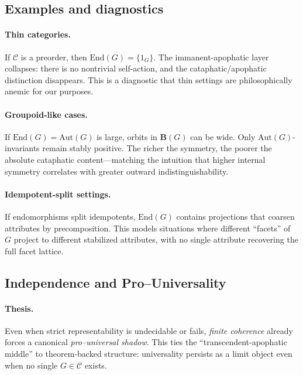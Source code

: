 \documentclass[11pt]{article}
\theoremstyle{upright}
\begin{document}
\subsection{Examples and diagnostics}
\paragraph{Thin categories.} If \(\mathcal C\) is a preorder, then \(\mathrm{End}(G)=\{1_G\}\). The immanent-apophatic layer collapses: there is no nontrivial self-action, and the cataphatic/apophatic distinction disappears. This is a diagnostic that thin settings are philosophically anemic for our purposes.

\paragraph{Groupoid-like cases.} If \(\mathrm{End}(G)=\mathrm{Aut}(G)\) is large, orbits in \(\mathbf B(G)\) can be wide. Only \(\mathrm{Aut}(G)\)-invariants remain stably positive. The richer the symmetry, the poorer the absolute cataphatic content—matching the intuition that higher internal symmetry correlates with greater outward indistinguishability.

\paragraph{Idempotent-split settings.} If endomorphisms split idempotents, \(\mathrm{End}(G)\) contains projections that coarsen attributes by precomposition. This models situations where different “facets” of \(G\) project to different stabilized attributes, with no single attribute recovering the full facet lattice.

\subsection{Independence and Pro–Universality}\label{sec:independence-pro}

\paragraph{Thesis.}
Even when strict representability is undecidable or fails, \emph{finite coherence} already forces a canonical \emph{pro–universal shadow}. This ties the ``transcendent-apophatic middle'' to theorem-backed structure: universality persists as a limit object even when no single $G\in\mathcal C$ exists.
\end{document}
